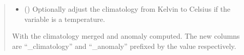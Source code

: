 \documentclass[letterpaper,10pt,english]{sphinxmanual}
\begin{document}
\begin{fulllineitems}
\begin{quote}
\begin{description}
\begin{itemize}
\item {}
\sphinxAtStartPar
{} () \textendash{} Optionally adjust the climatology from Kelvin to Celsius if the variable
is a temperature.

\end{itemize}

\sphinxAtStartPar
{} \textendash{} With the climatology merged and anomaly computed. The new columns are
“\_climatology” and “\_anomaly” prefixed by the  value
respectively.

\sphinxAtStartPar
{}

\end{description}\end{quote}

\end{fulllineitems}

\end{document}

